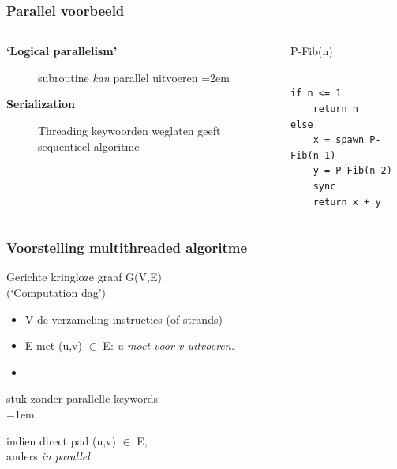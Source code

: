 \documentclass
   [kulak] %
   {kulakbeamer}
\begin{document}
\begin{frame}[fragile]
	\frametitle{Parallel voorbeeld}
	
	
	
	\begin{columns}[T] %
		\begin{column}{.48\textwidth}
			\begin{minipage}[c][.6\textheight][c]{\linewidth}
				
				
				
				
				
				
				\begin{description}
					\item[\textbf{`Logical parallelism'}] subroutine \textit{kan} parallel uitvoeren
					\itemsep=2em
					\item[\textbf{Serialization}] Threading keywoorden weglaten geeft sequentieel algoritme
				\end{description}
				
			\end{minipage}
		\end{column}
	


\begin{column}{.48\textwidth}

P-Fib(n)
\begin{lstlisting}[style=CStyle]

if n <= 1
	return n
else 
	x = spawn P-Fib(n-1)
	y = P-Fib(n-2)
	sync
	return x + y

\end{lstlisting}

\end{column}

\end{columns}

\end{frame}




\begin{frame}
	\frametitle{Voorstelling multithreaded algoritme}
	\pause
	Gerichte kringloze graaf G(V,E) \\ (`Computation dag')
	
	\begin{itemize}
		\item V de verzameling instructies (of strands)
		
		\item E met  (u,v) $\in$ E: \textit{ u moet voor v uitvoeren.}
		\item[]
		
	\end{itemize}
	
	\begin{description}
		
	
	\pause \item
	[\textit{Strand}] stuk zonder parallelle keywords \\
	\pause \itemsep=1em \item
	[Strands $u$ en $v$ \textit{`in serie'}] indien direct pad (u,v) $\in$ E, \\ anders \textit{in parallel}
\end{description}
\end{frame}
\end{document}
